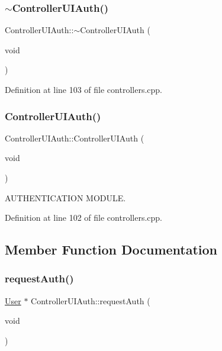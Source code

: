\subsubsection{\texorpdfstring{$\sim$\+Controller\+U\+I\+Auth()}{~ControllerUIAuth()}}
{\footnotesize\ttfamily Controller\+U\+I\+Auth\+::$\sim$\+Controller\+U\+I\+Auth (\begin{DoxyParamCaption}\item[{void}]{ }\end{DoxyParamCaption})}



Definition at line 103 of file controllers.\+cpp.

\mbox{\label{class_controller_u_i_auth_a0976b0902249eebb55d7e449797c8545}} 
\subsubsection{\texorpdfstring{Controller\+U\+I\+Auth()}{ControllerUIAuth()}}
{\footnotesize\ttfamily Controller\+U\+I\+Auth\+::\+Controller\+U\+I\+Auth (\begin{DoxyParamCaption}\item[{void}]{ }\end{DoxyParamCaption})}



A\+U\+T\+H\+E\+N\+T\+I\+C\+A\+T\+I\+ON M\+O\+D\+U\+LE. 



Definition at line 102 of file controllers.\+cpp.



\subsection{Member Function Documentation}
\mbox{\label{class_controller_u_i_auth_afb3e3fe781985fe7c7977b2c151dcd7a}} 
\subsubsection{\texorpdfstring{request\+Auth()}{requestAuth()}}
{\footnotesize\ttfamily \hyperlink{class_user}{User} $\ast$ Controller\+U\+I\+Auth\+::request\+Auth (\begin{DoxyParamCaption}\item[{void}]{ }\end{DoxyParamCaption})\hspace{0.3cm}{\ttfamily [virtual]}}

